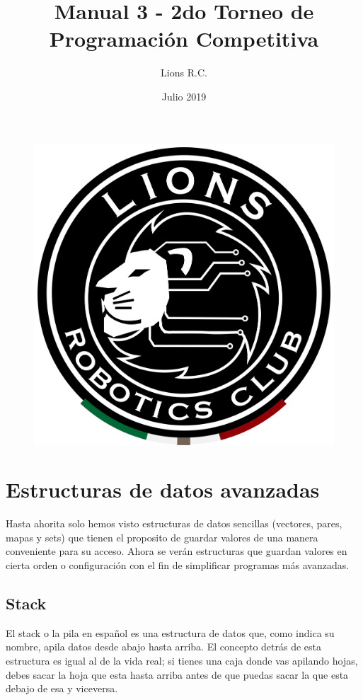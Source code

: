 \documentclass{article}
\title{Manual 3 - 2do Torneo de Programación Competitiva}
\author{Lions R.C.}
\date{Julio 2019}
\begin{document}
\maketitle

\tableofcontents

\begin{figure}[H]
    \centering
    \includegraphics[width=0.2\paperwidth]{newblack}
\end{figure}

\section{Estructuras de datos avanzadas}

Hasta ahorita solo hemos visto estructuras de datos sencillas (vectores, pares, mapas y sets) que tienen el proposito de guardar valores de una manera conveniente para su acceso. Ahora se verán estructuras que guardan valores en cierta orden o configuración con el fin de simplificar programas más avanzadas.

\subsection{Stack}

El stack o la pila en español es una estructura de datos que, como indica su nombre, apila datos desde abajo hasta arriba. El concepto detrás de esta estructura es igual al de la vida real; si tienes una caja donde vas apilando hojas, debes sacar la hoja que esta hasta arriba antes de que puedas sacar la que esta debajo de esa y viceversa.
\end{document}
